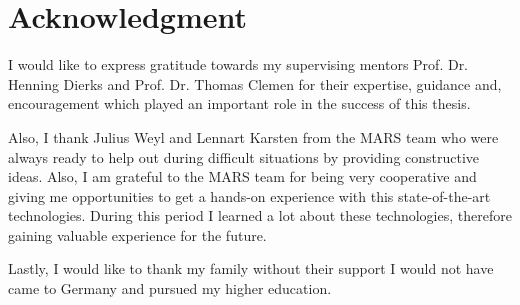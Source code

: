 \newpage
\thispagestyle{empty}
\section*{Acknowledgment}
I would like to express gratitude towards my supervising mentors Prof. Dr. Henning Dierks and Prof. Dr. Thomas Clemen for their expertise, guidance and, 
encouragement which played an important role in the success of this thesis. 

Also, I thank Julius Weyl and Lennart Karsten from the MARS team who were always ready to help out during difficult situations by providing constructive
ideas. Also, I am grateful to the MARS team for being very cooperative and giving me opportunities to get a hands-on experience with this state-of-the-art technologies.
During this period I learned a lot about these technologies, therefore
gaining valuable experience for the future.

Lastly, I would like to thank my family without their support I would not have came to Germany and pursued my higher education.
